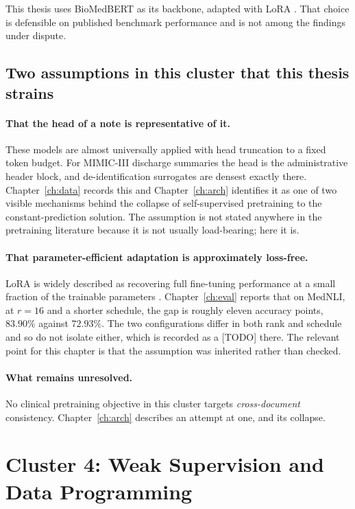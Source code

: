 This thesis uses BioMedBERT as its backbone, adapted with LoRA
\citep{hu2022lora}. That choice is defensible on published benchmark
performance and is not among the findings under dispute.

\subsection{Two assumptions in this cluster that this thesis strains}

\paragraph{That the head of a note is representative of it.} These models are
almost universally applied with head truncation to a fixed token budget. For
MIMIC-III discharge summaries the head is the administrative header block, and
de-identification surrogates \citep{neamatullah2008deid} are densest exactly
there. Chapter~\ref{ch:data} records this and Chapter~\ref{ch:arch} identifies
it as one of two visible mechanisms behind the collapse of self-supervised
pretraining to the constant-prediction solution. The assumption is not stated
anywhere in the pretraining literature because it is not usually load-bearing;
here it is.

\paragraph{That parameter-efficient adaptation is approximately loss-free.}
LoRA is widely described as recovering full fine-tuning performance at a small
fraction of the trainable parameters \citep{hu2022lora}. Chapter~\ref{ch:eval}
reports that on MedNLI, at $r = 16$ and a shorter schedule, the gap is roughly
eleven accuracy points, $83.90\%$ against $72.93\%$. The two configurations
differ in both rank and schedule and so do not isolate either, which is recorded
as a [TODO] there. The relevant point for this chapter is that the assumption
was inherited rather than checked.

\paragraph{What remains unresolved.} No clinical pretraining objective in this
cluster targets \emph{cross-document} consistency. Chapter~\ref{ch:arch}
describes an attempt at one, and its collapse.

\section{Cluster 4: Weak Supervision and Data Programming}
\label{sec:bg-weak}

